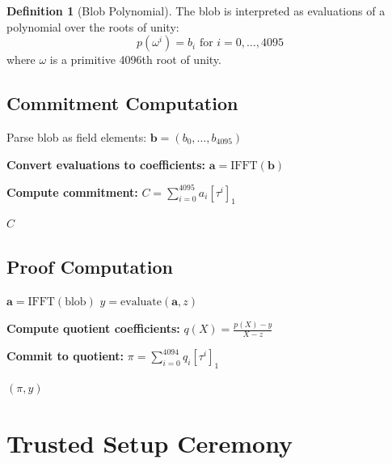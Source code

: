\documentclass[11pt,a4paper]{article}
\theoremstyle{definition}
\newtheorem{definition}{Definition}
\begin{document}
\begin{definition}[Blob Polynomial]
    The blob is interpreted as evaluations of a polynomial over the roots of unity:
    \[
    p(\omega^i) = b_i \text{ for } i = 0, \ldots, 4095
    \]
    where $\omega$ is a primitive 4096th root of unity.
\end{definition}

\subsection{Commitment Computation}

\begin{algorithm}
\caption{Blob to KZG Commitment}
\begin{algorithmic}[1]
    \State Parse blob as field elements: $\mathbf{b} = (b_0, \ldots, b_{4095})$

    \State \textbf{Convert evaluations to coefficients:}
    \State $\mathbf{a} = \text{IFFT}(\mathbf{b})$ 

    \State \textbf{Compute commitment:}
    \State $C = \sum_{i=0}^{4095} a_i [\tau^i]_1$ 

    \State \Return $C$
\EndFunction
\end{algorithmic}
\end{algorithm}

\subsection{Proof Computation}

\begin{algorithm}
\caption{Compute KZG Proof}
\begin{algorithmic}[1]
    \State $\mathbf{a} = \text{IFFT}(\text{blob})$ 
    \State $y = \text{evaluate}(\mathbf{a}, z)$ 

    \State \textbf{Compute quotient coefficients:}
    \State $q(X) = \frac{p(X) - y}{X - z}$

    \State \textbf{Commit to quotient:}
    \State $\pi = \sum_{i=0}^{4094} q_i [\tau^i]_1$

    \State \Return $(\pi, y)$
\EndFunction
\end{algorithmic}
\end{algorithm}

\section{Trusted Setup Ceremony}
\end{document}
